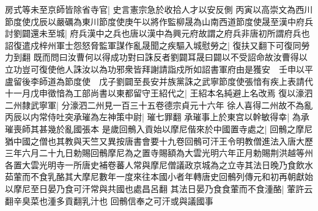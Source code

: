 房式等未至京師皆除省寺官|{
	史言憲宗急於收拾人才以安反側}
丙寅以高崇文為西川節度使戊辰以嚴礪為東川節度使庚午以將作監柳晟為山南西道節度使晟至漢中府兵討劉闢還未至城|{
	府兵漢中之兵也唐以漢中為興元府故謂之府兵非唐初所謂府兵也}
詔復遣戍梓州軍士怨怒脅監軍謀作亂晟聞之疾驅入城慰勞之|{
	復扶又翻下可復同勞力到翻}
既而問曰汝曹何以得成功對曰誅反者劉闢耳晟曰闢以不受詔命故汝曹得以立功豈可復使他人誅汝以為功邪衆皆拜謝請詣戍所如詔書軍府由是獲安　壬申以平盧留後李師道為節度使　戊子劉闢至長安并族黨誅之武寧節度使張愔有疾上表請代十一月戊申徵愔為工部尚書以東都留守王紹代之|{
	王紹本名純避上名改焉}
復以濠泗二州隸武寧軍|{
	分濠泗二州見一百三十五卷德宗貞元十六年}
徐人喜得二州故不為亂　丙辰以内常侍吐突承璀為左神策中尉|{
	璀七罪翻}
承璀事上於東宫以幹敏得幸|{
	為承璀喪師其甚幾於亂國張本}
是歲回鶻入貢始以摩尼偕來於中國置寺處之|{
	回鶻之摩尼猶中國之僧也其教與天竺又異按唐書會要十九卷回鶻可汗王令明教僧進法入唐大歷三年六月二十九日勅賜回鶻摩尼為之置寺賜額為大雲光明六年正月勅賜荆洪越等州各置大雲光明寺一所唐史補卷蕃人常與摩尼僧議政京城為之立寺其法日晚乃食飲水茹葷而不食乳酪其大摩尼數年一度來往本國小者年轉唐史回鶻列傳元和初再朝獻始以摩尼至日晏乃食可汗常與共國也處昌呂翻}
其法日晏乃食食葷而不食湩酪|{
	葷許云翻辛臭菜也湩多貢翻乳汁也}
回鶻信奉之可汗或與議國事

